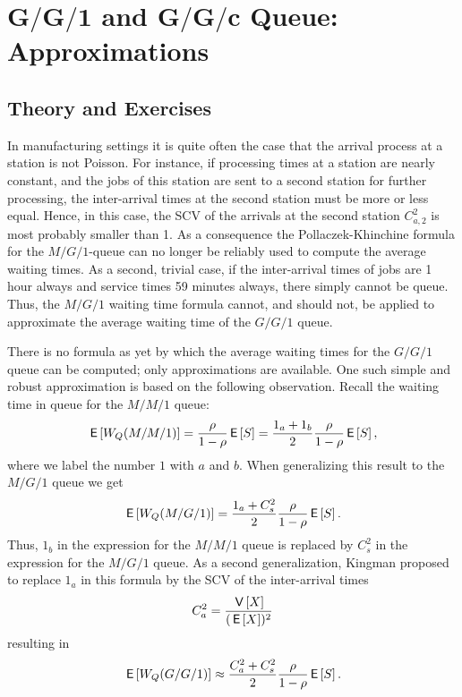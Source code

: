 \section
[$G/G/1$  and $G/G/c$ Queue: Approximations]
{$\mathbf{G/G/1}$  and $\mathbf{G/G/c}$ Queue: Approximations}
\label{sec:gg1}


\subsection*{Theory and Exercises}






In manufacturing settings it is quite often the case that the arrival
process at a station is not Poisson. For instance, if processing times
at a station are nearly constant, and the jobs of this station are
sent to a second station for further processing, the inter-arrival
times at the second station must be more or less equal. Hence, in this
case, the SCV of the arrivals at the second station $C_{a,2}^2$ is
most probably smaller than 1. As a consequence the
Pollaczek-Khinchine formula for the $M/G/1$-queue can no longer be
reliably used to compute the average waiting times.  As a second,
trivial case, if the inter-arrival times of jobs are 1 hour always and
service times 59 minutes always, there simply cannot be queue. Thus,
the $M/G/1$ waiting time formula cannot, and should not, be applied to
approximate the average waiting time of the $G/G/1$ queue. 

There is no formula as yet by which the average waiting times for the
$G/G/1$ queue can be computed; only approximations are available. One
such simple and robust approximation is based on the following
observation. Recall  the waiting time in queue for the $M/M/1$ queue:
\begin{equation*}
  \,\mathsf{E}\left[W_Q(M/M/1)\right] = \frac{\rho}{1-\rho} \,\mathsf{E}\left[S\right] = 
\frac{1_a + 1_b}2 \frac{\rho}{1-\rho} \,\mathsf{E}\left[S\right],
\end{equation*}
where we label the number $1$ with $a$ and $b$. When generalizing this
result to the $M/G/1$ queue we get
\begin{equation*}
  \,\mathsf{E}\left[W_Q(M/G/1)\right] = \frac{1_a + C_s^2}2 \frac{\rho}{1-\rho} \,\mathsf{E}\left[S\right].
\end{equation*}
Thus, $1_b$ in the expression for the $M/M/1$ queue is replaced by
$C_s^2$ in the expression for the $M/G/1$ queue. As a second
generalization, Kingman proposed to replace $1_a$ in this formula by
the SCV of the inter-arrival times
\begin{equation*}
C_a^2 = \frac{\,\mathsf{V}\left[X\right]}{(\,\mathsf{E}\left[X\right])^2}
\end{equation*}
resulting in
\begin{equation*}
  \,\mathsf{E}\left[W_Q(G/G/1)\right] \approx \frac{C_a^2 + C_s^2}2 \frac{\rho}{1-\rho} \,\mathsf{E}\left[S\right].
\end{equation*}

